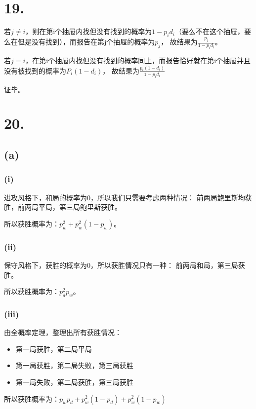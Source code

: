 \documentclass[UTF8]{report}
\begin{document}
    \section*{19.}
        若$j \ne i$，则在第i个抽屉内找但没有找到的概率为$1 - p_id_i$（要么不在这个抽屉，要么在但是没有找到），而报告在第j个抽屉的概率为$p_j$，
        故结果为$\frac{p_j}{1 - p_id_i}$。

        若$j = i$，在第i个抽屉内找但没有找到的概率同上，而报告恰好就在第i个抽屉并且没有被找到的概率为$P_i(1 - d_i)$，
        故结果为$\frac{p_i(1 - d_i)}{1 - p_id_i}$

        证毕。
    \section*{20.}
        \subsection*{(a)}
            \subsubsection*{(i)}
                进攻风格下，和局的概率为0，所以我们只需要考虑两种情况：
                前两局鲍里斯均获胜，前两局平局，第三局鲍里斯获胜。

                所以获胜概率为：$p_w^2 + p_w^2(1 - p_w)$。
            \subsubsection*{(ii)}
                保守风格下，获胜的概率为0，所以获胜情况只有一种：
                前两局和局，第三局获胜。

                所以获胜概率为：$p_d^2p_w$。
            \subsubsection*{(iii)}
                由全概率定理，整理出所有获胜情况：

                \begin{itemize}
                    \item 第一局获胜，第二局平局
                    \item 第一局获胜，第二局失败，第三局获胜
                    \item 第一局失败，第二局获胜，第三局获胜
                \end{itemize}

                所以获胜概率为：$p_wp_d + p_w^2(1 - p_d) + p_w^2(1 - p_w)$
\end{document}

